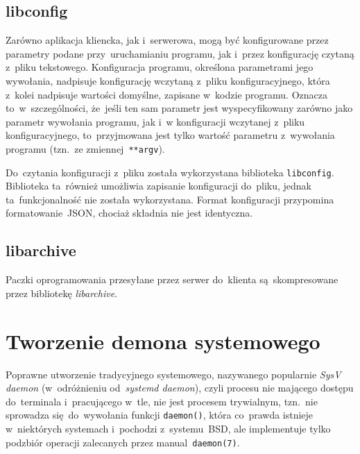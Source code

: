 \documentclass[thesis]{subfiles}
\begin{document}

\subsection{libconfig}

Zarówno aplikacja kliencka, jak i~serwerowa, mogą być konfigurowane przez parametry podane przy~uruchamianiu programu, jak i~przez konfigurację czytaną z~pliku tekstowego. Konfiguracja programu, określona parametrami jego wywołania, nadpisuje konfigurację wczytaną z~pliku konfiguracyjnego, która z~kolei nadpisuje wartości domyślne, zapisane w~kodzie programu. Oznacza to~w~szczególności, że~jeśli ten sam parametr jest wyspecyfikowany zarówno jako parametr wywołania programu, jak i~w konfiguracji wczytanej z~pliku konfiguracyjnego, to~przyjmowana jest tylko wartość parametru z~wywołania programu (tzn.~ze zmiennej~\texttt{**argv}).

Do~czytania konfiguracji z~pliku została wykorzystana biblioteka \texttt{libconfig}. Biblioteka ta~również umożliwia zapisanie konfiguracji do~pliku, jednak ta~funkcjonalność nie została wykorzystana. Format konfiguracji przypomina formatowanie~JSON, chociaż składnia nie jest identyczna.


\subsection{libarchive}

Paczki oprogramowania przesyłane przez serwer do~klienta są~skompresowane przez bibliotekę \emph{libarchive}.


\section{Tworzenie demona systemowego}

Poprawne utworzenie tradycyjnego   systemowego, nazywanego popularnie \emph{SysV daemon} (w~odróżnieniu od~\emph{systemd daemon}), czyli procesu nie mającego dostępu do~terminala i~pracującego w~tle, nie jest procesem trywialnym, tzn.~nie sprowadza się~do~wywołania funkcji \texttt{daemon()}, która co~prawda istnieje w~niektórych systemach i~pochodzi z~systemu~BSD, ale implementuje tylko podzbiór operacji zalecanych przez manual~\texttt{daemon(7)}.
\end{document}
